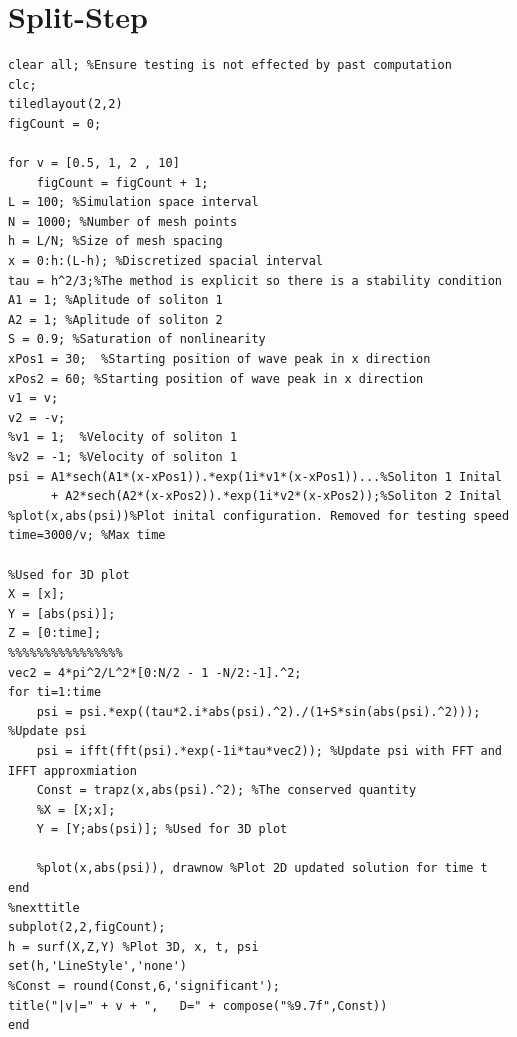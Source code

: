 \documentclass{article}
\begin{document}
\section{Split-Step}
\begin{lstlisting}
clear all; %Ensure testing is not effected by past computation
clc;
tiledlayout(2,2)
figCount = 0;

for v = [0.5, 1, 2 , 10]
    figCount = figCount + 1;
L = 100; %Simulation space interval
N = 1000; %Number of mesh points
h = L/N; %Size of mesh spacing
x = 0:h:(L-h); %Discretized spacial interval
tau = h^2/3;%The method is explicit so there is a stability condition
A1 = 1; %Aplitude of soliton 1
A2 = 1; %Aplitude of soliton 2
S = 0.9; %Saturation of nonlinearity
xPos1 = 30;  %Starting position of wave peak in x direction
xPos2 = 60; %Starting position of wave peak in x direction
v1 = v;
v2 = -v;
%v1 = 1;  %Velocity of soliton 1
%v2 = -1; %Velocity of soliton 1
psi = A1*sech(A1*(x-xPos1)).*exp(1i*v1*(x-xPos1))...%Soliton 1 Inital
      + A2*sech(A2*(x-xPos2)).*exp(1i*v2*(x-xPos2));%Soliton 2 Inital
%plot(x,abs(psi))%Plot inital configuration. Removed for testing speed
time=3000/v; %Max time

%Used for 3D plot
X = [x];
Y = [abs(psi)];
Z = [0:time];
%%%%%%%%%%%%%%%%
vec2 = 4*pi^2/L^2*[0:N/2 - 1 -N/2:-1].^2;
for ti=1:time
    psi = psi.*exp((tau*2.i*abs(psi).^2)./(1+S*sin(abs(psi).^2))); %Update psi
    psi = ifft(fft(psi).*exp(-1i*tau*vec2)); %Update psi with FFT and IFFT approxmiation
    Const = trapz(x,abs(psi).^2); %The conserved quantity
    %X = [X;x];
    Y = [Y;abs(psi)]; %Used for 3D plot
    
    %plot(x,abs(psi)), drawnow %Plot 2D updated solution for time t
end
%nexttitle
subplot(2,2,figCount);
h = surf(X,Z,Y) %Plot 3D, x, t, psi
set(h,'LineStyle','none')
%Const = round(Const,6,'significant');
title("|v|=" + v + ",   D=" + compose("%9.7f",Const))
end
\end{lstlisting}
\pagebreak
\end{document}

